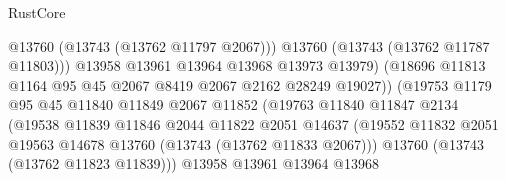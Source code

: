 \begin{lexlean}{RustCore}
\begin{coremodule}
                                            @13760
                                            (@13743 (@13762 @11797 @2067)))
                                          @13760
                                          (@13743 (@13762 @11787 @11803)))
                                        @13958
                                        @13961
                                        @13964
                                        @13968
                                        @13973
                                        @13979)
                                      (@18696
                                        @11813
                                        @1164
                                        @95
                                        @45
                                        @2067
                                        @8419
                                        @2067
                                        @2162
                                        @28249
                                        @19027))
                                    (@19753
                                      @1179
                                      @95
                                      @45
                                      @11840
                                      @11849
                                      @2067
                                      @11852
                                      (@19763
                                        @11840
                                        @11847
                                        @2134
                                        (@19538
                                          @11839
                                          @11846
                                          @2044
                                          @11822
                                          @2051
                                          @14637
                                          (@19552
                                            @11832
                                            @2051
                                            @19563
                                            @14678
                                            @13760
                                            (@13743 (@13762 @11833 @2067)))
                                          @13760
                                          (@13743 (@13762 @11823 @11839)))
                                        @13958
                                        @13961
                                        @13964
                                        @13968

\end{coremodule}
\end{lexlean}

